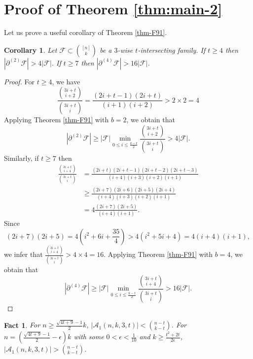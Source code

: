 \documentclass[11pt,a4paper]{article}
\newtheorem{false statement}{False statement}
\newtheorem{cor}[thm]{Corollary}
\newtheorem{fact}[thm]{Fact}
\theoremstyle{definition}
\def\hf{\mathcal{F}}
\def\ha{\mathcal{A}}
\begin{document}
\section{Proof of Theorem \ref{thm:main-2}}

Let us prove a useful corollary of Theorem \ref{thm-F91}.

\begin{cor}\label{cor-4.1}
Let $\hf\subset \binom{[n]}{k}$ be a $3$-wise $t$-intersecting family. If $t\geq 4$ then $|\partial^{(2)} \hf|>4|\hf|$. If $t\geq 7$ then $|\partial^{(4)} \hf|>16|\hf|$.
\end{cor}

\begin{proof}
For $t\geq 4$, we have
\[
\frac{\binom{3i+t}{i+2}}{\binom{3i+t}{i}} = \frac{(2i+t-1)(2i+t)}{(i+1)(i+2)}>2\times 2=4
\]
Applying Theorem \ref{thm-F91} with $b=2$, we obtain that
\[
|\partial^{(2)} \hf| \geq |\hf| \min_{0\leq i\leq \frac{k-t}{2}} \frac{\binom{3i+t}{i+2}}{\binom{3i+t}{i}} >4|\hf|.
\]
Similarly, if $t\geq 7$ then
\begin{align*}
\frac{\binom{3i+t}{i+4}}{\binom{3i+t}{i}} &=\frac{(2i+t)(2i+t-1)(2i+t-2)(2i+t-3)}{(i+4)(i+3)(i+2)(i+1)}\\[2pt]
&\geq \frac{(2i+7)(2i+6)(2i+5)(2i+4)}{(i+4)(i+3)(i+2)(i+1)} \\[2pt]
&=4\frac{(2i+7)(2i+5)}{(i+4)(i+1)}.
\end{align*}
Since
\[
(2i+7)(2i+5)=4\left(i^2+6i+\frac{35}{4}\right) >4(i^2+5i+4) =4(i+4)(i+1),
\]
we infer that $\frac{\binom{3i+t}{i+4}}{\binom{3i+t}{i}} >4\times 4=16$.
Applying Theorem \ref{thm-F91} with $b=4$, we obtain that
\[
|\partial^{(4)} \hf| \geq |\hf| \min_{0\leq i\leq \frac{k-t}{2}} \frac{\binom{3i+t}{i+4}}{\binom{3i+t}{i}} >16|\hf|.
\]
\end{proof}
\begin{fact}\label{fact-4.7}
For $n\geq \frac{\sqrt{4t+9}-1}{2}k$, $|\ha_1(n,k,3,t)|<\binom{n-t}{k-t}$. For $n=  \left(\frac{\sqrt{4t+9}-1}{2}-\epsilon\right)k$ with some  $0<\epsilon<\frac{1}{10}$ and $k\geq \frac{t^2+2t}{2\epsilon}$, $|\ha_1(n,k,3,t)|>\binom{n-t}{k-t}$.
\end{fact}
\end{document}
